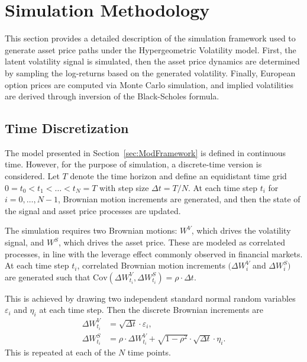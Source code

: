 \section{Simulation Methodology} \label{sec:SimulationMethodology}

This section provides a detailed description of the simulation framework used to generate asset price paths under the Hypergeometric Volatility model. First, the latent volatility signal is simulated, then the asset price dynamics are determined by sampling the log-returns based on the generated volatility. Finally, European option prices are computed via Monte Carlo simulation, and implied volatilities are derived through inversion of the Black-Scholes formula.


\subsection{Time Discretization} \label{subsec:TimeDiscretization}

The model presented in Section~\ref{sec:ModFramework} is defined in continuous time. However, for the purpose of simulation, a discrete-time version is considered. Let $T$ denote the time horizon and define an equidistant time grid $0 = t_0 < t_1 < \ldots < t_N = T$ with step size $\Delta t = T/N$. At each time step $t_i$ for $i = 0,\ldots,N-1$, Brownian motion increments are generated, and then the state of the signal and asset price processes are updated.

The simulation requires two Brownian motions: $W^V$, which drives the volatility signal, and $W^S$, which drives the asset price. These are modeled as correlated processes, in line with the leverage effect commonly observed in financial markets. At each time step $t_i$, correlated Brownian motion increments $(\Delta W_i^V$ and $\Delta W_i^S)$ are generated such that $\mathrm{Cov}(\Delta W_{t_i}^V, \Delta W_{t_i}^S) = \rho \cdot \Delta t$.

This is achieved by drawing two independent standard normal random variables $\varepsilon_i$ and $\eta_i$ at each time step. Then the discrete Brownian increments are
\begin{align} \label{eq:BrownianMotions}
    \Delta W_{t_i}^V &= \sqrt{\Delta t} \cdot \varepsilon_i, \\
    \Delta W_{t_i}^S &= \rho \cdot \Delta W_{t_i}^V + \sqrt{1 - \rho^2} \cdot \sqrt{\Delta t} \cdot \eta_i.
\end{align}
This is repeated at each of the $N$ time points.


